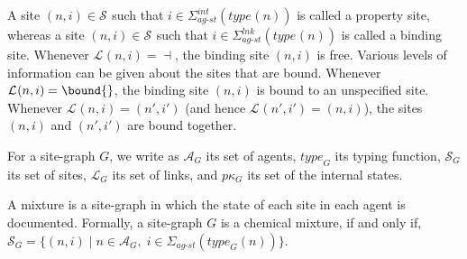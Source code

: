 \documentclass[10pt,a4paper]{llncs}
\newcommand{\linksite}{\signaturesymb^{\textit{lnk}}_{\textit{ag-st}}}
\newcommand{\statesite}{\signaturesymb^{\textit{int}}_{\textit{ag-st}}}
\newcommand{\bothsite}{\signaturesymb_{\textit{ag-st}}}
\newcommand{\signaturesymb}{\Sigma}
\newcommand{\graphsymb}{G}
\newcommand{\agents}[1][]{\mathcal{A}_{#1}}
\newcommand{\type}[1][]{\textit{type}_{#1}}
\newcommand{\sites}[1][]{\mathcal{S}_{#1}}
\newcommand{\links}[1][]{\mathcal{L}_{#1}}
\newcommand{\props}[1][]{p\kappa_{#1}}
\newcommand{\free}{\dashv}
\begin{document}
A site $(n,i)\in\sites$ such that $i\in\statesite(\type(n))$ is called a property site, whereas a site $(n,i)\in\sites$ such that $i\in\linksite(\type(n))$ is called a binding site.
Whenever $\links(n,i)=\free$, the binding site $(n,i)$ is free.
Various levels of information can be given about the sites that are bound.
Whenever $\links(n,i)=\bound{}$, the binding site $(n,i)$ is bound to an unspecified site.
Whenever $\links(n,i)=(n',i')$ (and hence $\links(n',i')=(n,i)$), the sites $(n,i)$ and $(n',i')$ are bound together.

For a site-graph $\graphsymb$, we write as $\agents[\graphsymb]$ its set of agents, $\type[\graphsymb]$ its typing function, $\sites[\graphsymb]$ its set of sites, $\links[\graphsymb]$ its set of links, and $\props[\graphsymb]$ its set of the internal states.

A mixture is a site-graph in which the state of each site in each agent is documented. Formally, a site-graph $\graphsymb$ is a chemical mixture, if and only if, $\sites[\graphsymb]=\{(n,i)\;|\;n\in\agents[\graphsymb],\;i\in\bothsite(\type[\graphsymb](n))\}$.
\end{document}
